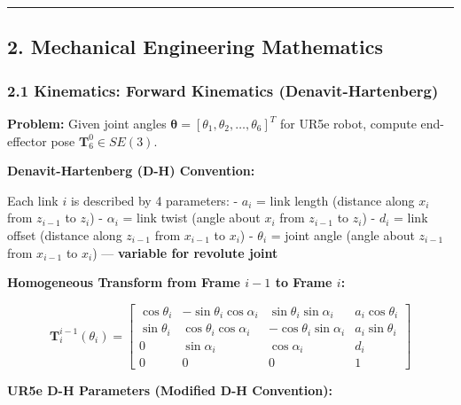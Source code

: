 \documentclass[
]{article}
\begin{document}
\begin{center}\rule{0.5\linewidth}{0.5pt}\end{center}

\hypertarget{mechanical-engineering-mathematics}{%
\subsection{2. Mechanical Engineering
Mathematics}\label{mechanical-engineering-mathematics}}

\hypertarget{kinematics-forward-kinematics-denavit-hartenberg}{%
\subsubsection{2.1 Kinematics: Forward Kinematics
(Denavit-Hartenberg)}\label{kinematics-forward-kinematics-denavit-hartenberg}}

\textbf{Problem:} Given joint angles
\(\boldsymbol{\theta} = [\theta_1, \theta_2, \ldots, \theta_6]^T\) for
UR5e robot, compute end-effector pose \(\mathbf{T}_6^0 \in SE(3)\).

\textbf{Denavit-Hartenberg (D-H) Convention:}

Each link \(i\) is described by 4 parameters: - \(a_i\) = link length
(distance along \(x_i\) from \(z_{i-1}\) to \(z_i\)) - \(\alpha_i\) =
link twist (angle about \(x_i\) from \(z_{i-1}\) to \(z_i\)) - \(d_i\) =
link offset (distance along \(z_{i-1}\) from \(x_{i-1}\) to \(x_i\)) -
\(\theta_i\) = joint angle (angle about \(z_{i-1}\) from \(x_{i-1}\) to
\(x_i\)) --- \textbf{variable for revolute joint}

\textbf{Homogeneous Transform from Frame \(i-1\) to Frame \(i\):}

\[
\mathbf{T}_i^{i-1}(\theta_i) =
\begin{bmatrix}
\cos\theta_i & -\sin\theta_i \cos\alpha_i & \sin\theta_i \sin\alpha_i & a_i \cos\theta_i \\
\sin\theta_i & \cos\theta_i \cos\alpha_i & -\cos\theta_i \sin\alpha_i & a_i \sin\theta_i \\
0 & \sin\alpha_i & \cos\alpha_i & d_i \\
0 & 0 & 0 & 1
\end{bmatrix}
\]

\textbf{UR5e D-H Parameters (Modified D-H Convention):}
\end{document}
